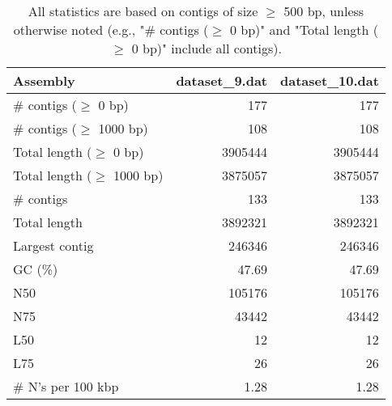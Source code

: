 \documentclass[12pt,a4paper]{article}
\begin{document}
\begin{table}[ht]
\begin{center}
\caption{All statistics are based on contigs of size $\geq$ 500 bp, unless otherwise noted (e.g., "\# contigs ($\geq$ 0 bp)" and "Total length ($\geq$ 0 bp)" include all contigs).}
\begin{tabular}{|l*{2}{|r}|}
\hline
Assembly & dataset\_9.dat & dataset\_10.dat \\ \hline
\# contigs ($\geq$ 0 bp) & 177 & 177 \\ \hline
\# contigs ($\geq$ 1000 bp) & 108 & 108 \\ \hline
Total length ($\geq$ 0 bp) & 3905444 & 3905444 \\ \hline
Total length ($\geq$ 1000 bp) & 3875057 & 3875057 \\ \hline
\# contigs & 133 & 133 \\ \hline
Total length & 3892321 & 3892321 \\ \hline
Largest contig & 246346 & 246346 \\ \hline
GC (\%) & 47.69 & 47.69 \\ \hline
N50 & 105176 & 105176 \\ \hline
N75 & 43442 & 43442 \\ \hline
L50 & 12 & 12 \\ \hline
L75 & 26 & 26 \\ \hline
\# N's per 100 kbp & 1.28 & 1.28 \\ \hline
\end{tabular}
\end{center}
\end{table}
\end{document}
